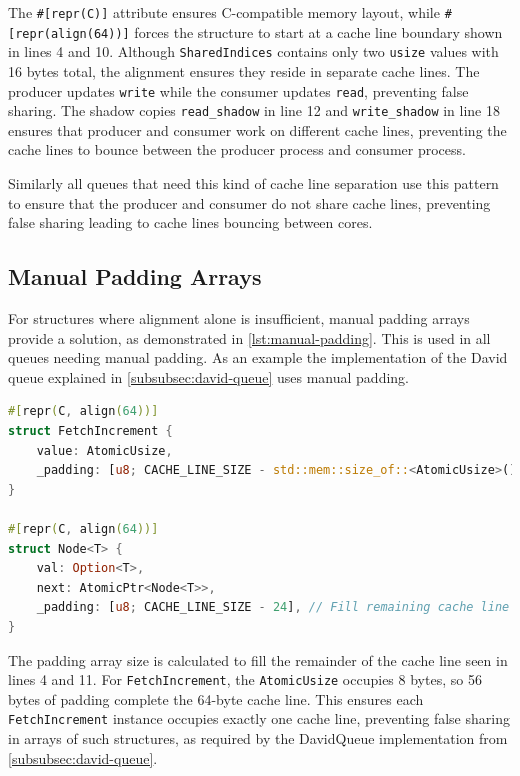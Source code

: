The \texttt{\#[repr(C)]} attribute ensures C-compatible memory layout, while \newline \texttt{\#[repr(align(64))]} forces the structure to start at a cache line boundary shown in lines 4 and 10. Although \texttt{SharedIndices} contains only two \texttt{usize} values with 16 bytes total, the alignment ensures they reside in separate cache lines. The producer updates \texttt{write} while the consumer updates \texttt{read}, preventing false sharing. The shadow copies \texttt{read\_shadow} in line 12 and \texttt{write\_shadow} in line 18 ensures that producer and consumer work on different cache lines, preventing the cache lines to bounce between the producer process and consumer process.

Similarly all queues that need this kind of cache line separation use this pattern to ensure that the producer and consumer do not share cache lines, preventing false sharing leading to cache lines bouncing between cores.

\subsection{Manual Padding Arrays}

For structures where alignment alone is insufficient, manual padding arrays provide a solution, as demonstrated in \cref{lst:manual-padding}. This is used in all queues needing manual padding. As an example the implementation of the David queue explained in \cref{subsubsec:david-queue} uses manual padding.

\begin{lstlisting}[language=Rust, style=boxed, caption={Manual padding for exact cache line control}, label={lst:manual-padding}]
#[repr(C, align(64))]
struct FetchIncrement {
    value: AtomicUsize,
    _padding: [u8; CACHE_LINE_SIZE - std::mem::size_of::<AtomicUsize>()],
}

#[repr(C, align(64))]
struct Node<T> {
    val: Option<T>,
    next: AtomicPtr<Node<T>>,
    _padding: [u8; CACHE_LINE_SIZE - 24], // Fill remaining cache line
}
\end{lstlisting}

The padding array size is calculated to fill the remainder of the cache line seen in lines 4 and 11. For \texttt{FetchIncrement}, the \texttt{AtomicUsize} occupies 8 bytes, so 56 bytes of padding complete the 64-byte cache line. This ensures each \texttt{FetchIncrement} instance occupies exactly one cache line, preventing false sharing in arrays of such structures, as required by the DavidQueue implementation from \cref{subsubsec:david-queue}.

